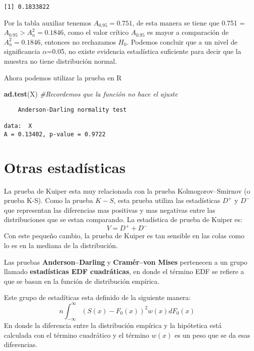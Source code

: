 \documentclass[
  a4paper,
  oneside,
  openany]{book}
\newenvironment{Shaded}{\begin{snugshade}}{\end{snugshade}}
\newcommand{\CommentTok}[1]{\textcolor[rgb]{0.56,0.35,0.01}{\textit{#1}}}
\newcommand{\KeywordTok}[1]{\textcolor[rgb]{0.13,0.29,0.53}{\textbf{#1}}}
\newcommand{\NormalTok}[1]{#1}
\begin{document}
\begin{verbatim}
[1] 0.1833822
\end{verbatim}

Por la tabla auxiliar tenemos \(A_{0.95}=0.751\), de esta manera se tiene que 0.751 = \(A_{0.95} > A_{n}^2=0.1846\), como el valor crítico \(A_{0.95}\) es mayor a comparación de \(A_{n}^2=0.1846\), entonces no rechazamos \(H_0\). Podemos concluir que a un nivel de significancia \(\alpha\)=0.05, no existe evidencia estadística suficiente para decir que la muestra no tiene distribución normal.

Ahora podemos utilizar la prueba en R

\begin{Shaded}
\begin{Highlighting}[]
\KeywordTok{ad.test}\NormalTok{(X)   }\CommentTok{\#Recordemos que la función no hace el ajuste}
\end{Highlighting}
\end{Shaded}

\begin{verbatim}
    Anderson-Darling normality test

data:  X
A = 0.13402, p-value = 0.9722
\end{verbatim}

\hypertarget{otras-estaduxedsticas}{%
\chapter{Otras estadísticas}\label{otras-estaduxedsticas}}

La prueba de Kuiper esta muy relacionada con la prueba Kolmogorov--Smirnov (o prueba K-S). Como la prueba \(K-S\), esta prueba utiliza las estadísticas \(D^+\) y \(D^-\) que representan las diferencias mas positivas y mas negativas entre las distribuciones que se estan comparando. La estadística de prueba de Kuiper es:
\[V=D^+ + D^-\]
Con este pequeño cambio, la prueba de Kuiper es tan sensible en las colas como lo es en la mediana de la distribución.

Las pruebas \textbf{Anderson--Darling} y \textbf{Cramér--von Mises} pertenecen a un grupo llamado \textbf{estadísticas EDF cuadráticas}, en donde el término EDF se refiere a que se basan en la función de distribución empírica.

Este grupo de estadíticas esta definido de la siguiente manera:
\[n\int_{-\infty}^{\infty}(S(x)-F_0(x))^2w(x)dF_0(x)\]
En donde la diferencia entre la distribución empírica y la hipótetica está calculada con el término cuadrático y el término \(w(x)\) es un peso que se da esas diferencias.
\end{document}
